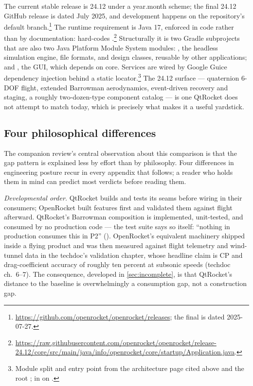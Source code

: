 The current stable release is 24.12 under a year.month scheme; the final 24.12 GitHub
release is dated July 2025, and development happens on the repository's default
 branch.\footnote{\url{https://github.com/openrocket/openrocket/releases};
the final  is dated 2025-07-27.} The runtime requirement is Java 17,
enforced in code rather than by documentation:  hard-codes
.\footnote{\url{https://raw.githubusercontent.com/openrocket/openrocket/release-24.12/core/src/main/java/info/openrocket/core/startup/Application.java}.}
Structurally it is two Gradle subprojects that are also two Java Platform Module System
modules: , the headless simulation engine, file formats, and
design classes, reusable by other applications; and , the GUI,
which depends on core. Services are wired by Google Guice dependency injection behind a
static locator.\footnote{Module split and entry point from the architecture page cited
above and the root ;  in
 on .} The 24.12 surface --- quaternion 6-DOF
flight, extended Barrowman aerodynamics, event-driven recovery and staging, a roughly
two-dozen-type component catalog --- is one QtRocket does not attempt to match today, which
is precisely what makes it a useful yardstick.

\subsection{Four philosophical differences}\label{app:or-context-differences}

The companion review's central observation about this comparison is that the gap pattern
is explained less by effort than by philosophy. Four differences in engineering posture
recur in every appendix that follows; a reader who holds them in mind can predict most
verdicts before reading them.

\emph{Developmental order.} QtRocket builds and tests its seams before wiring in their
consumers; OpenRocket built features first and validated them against flight afterward.
QtRocket's Barrowman composition is implemented, unit-tested, and consumed by no
production code --- the test suite says so itself: ``nothing in production consumes this
in P2'' (). OpenRocket's equivalent machinery shipped
inside a flying product and was then measured against flight telemetry and wind-tunnel
data in the techdoc's validation chapter, whose headline claim is CP and drag-coefficient
accuracy of roughly ten percent at subsonic speeds (techdoc ch.~6--7). The consequence,
developed in
\cref{sec:incomplete}, is that QtRocket's distance to the baseline is overwhelmingly a
consumption gap, not a construction gap.

